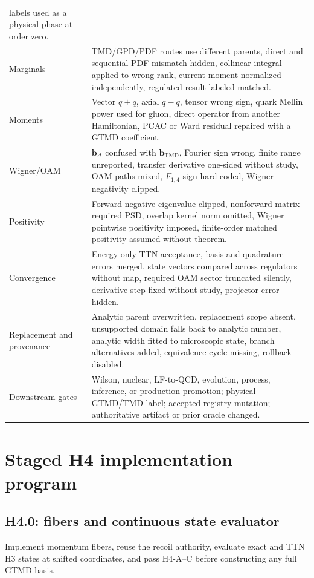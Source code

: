 \documentclass[11pt]{article}
\newcommand{\bD}{\bm{b}_{\Delta}}
\newcommand{\bM}{\bm{b}_{\mathrm{TMD}}}
\begin{document}
\begin{longtable}{L{0.18\textwidth}L{0.72\textwidth}}
labels used as a physical phase at order zero.\\
Marginals & TMD/GPD/PDF routes use different parents, direct and sequential
PDF mismatch hidden, collinear integral applied to wrong rank, current moment
normalized independently, regulated result labeled matched.\\
Moments & Vector \(q+\bar q\), axial \(q-\bar q\), tensor wrong sign, quark
Mellin power used for gluon, direct operator from another Hamiltonian, PCAC or
Ward residual repaired with a GTMD coefficient.\\
Wigner/OAM & \(\bD\) confused with \(\bM\), Fourier sign wrong, finite range
unreported, transfer derivative one-sided without study, OAM paths mixed,
\(F_{1,4}\) sign hard-coded, Wigner negativity clipped.\\
Positivity & Forward negative eigenvalue clipped, nonforward matrix required
PSD, overlap kernel norm omitted, Wigner pointwise positivity imposed,
finite-order matched positivity assumed without theorem.\\
Convergence & Energy-only TTN acceptance, basis and quadrature errors merged,
state vectors compared across regulators without map, required OAM sector
truncated silently, derivative step fixed without study, projector error hidden.\\
Replacement and provenance & Analytic parent overwritten, replacement scope absent,
unsupported domain falls back to analytic number, analytic width fitted to
microscopic state, branch alternatives added, equivalence cycle missing,
rollback disabled.\\
Downstream gates & Wilson, nuclear, LF-to-QCD, evolution, process, inference,
or production promotion; physical GTMD/TMD label; accepted registry mutation;
authoritative artifact or prior oracle changed.\\
\bottomrule
\end{longtable}

\section{Staged H4 implementation program}
\label{sec:stages}

\subsection{H4.0: fibers and continuous state evaluator}

Implement momentum fibers, reuse the recoil authority, evaluate exact and TTN
H3 states at shifted coordinates, and pass H4-A--C before constructing any
full GTMD basis.
\end{document}
